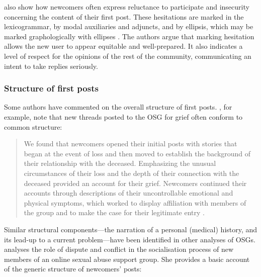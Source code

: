 \textcite{stommel_use_2011} also show how newcomers often express reluctance to participate and insecurity concerning the content of their first \gls{post}. These hesitations are marked in  the lexicogrammar, by modal auxiliaries and adjuncts, and by ellipsis, which may be marked graphologically with ellipses \parencite*[e.g. \emph{I'm still a bit unsure about what I should write \dots---}][p.~4]{stommel_use_2011}. The authors argue that marking hesitation allows the new user to appear equitable and well\hyp{}prepared. It also indicates a level of respect for the opinions of the rest of the community, communicating an intent to take replies seriously. 

\subsubsection{Structure of first posts} \label{sect:post-structure}

Some authors have commented on the overall structure of first posts. \textcite{varga2014grieving}, for example, note that new threads posted to the \gls{OSG} for grief often conform to common structure:

\begin{quote}\small\singlespacing
We found that newcomers opened their initial \glspl{post} with stories that began at the event of loss and then moved to establish the background of their relationship with the deceased. Emphasizing the unusual circumstances of their loss and the depth of their connection with the deceased provided an account for their grief. Newcomers continued their accounts through descriptions of their uncontrollable emotional and physical symptoms, which worked to display affiliation with \glspl{member} of the group and to make the case for their legitimate entry \parencite*[p.~5]{varga2014grieving}. 
\end{quote}
%
%
Similar structural components---the narration of a personal (medical) history, and its lead\hyp{}up to a current problem---have been identified in other analyses of \glspl{OSG}. \textcite[p.~4]{weber_missed_2011} analyses the role of dispute and conflict in the socialisation process of new \glspl{member} of an online sexual abuse support group. She provides a basic account of the generic structure of newcomers' \glspl{post}:


